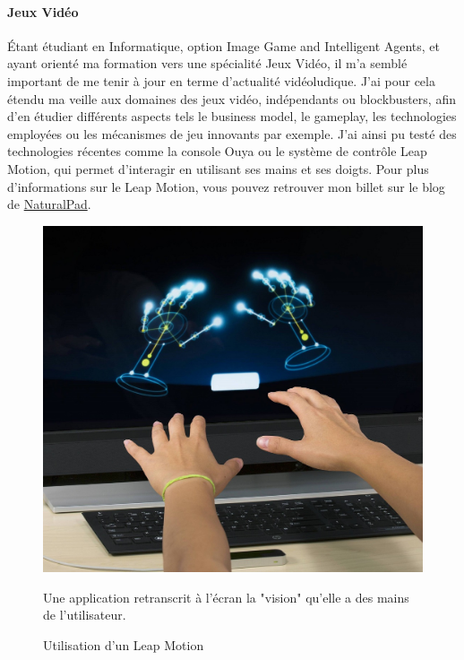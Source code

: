\paragraph{Jeux Vidéo\\ \quad}
Étant étudiant en Informatique, option Image Game and Intelligent Agents, et ayant orienté ma formation vers une spécialité Jeux Vidéo, il m'a semblé important de me tenir à jour en terme d'actualité vidéoludique. J'ai pour cela étendu ma veille aux domaines des jeux vidéo, indépendants ou blockbusters, afin d'en étudier différents aspects tels le business model, le gameplay, les technologies employées ou les mécanismes de jeu innovants par exemple. J'ai ainsi pu testé des technologies récentes comme la console Ouya ou le système de contrôle Leap Motion, qui permet d'interagir en utilisant ses mains et ses doigts. Pour plus d'informations sur le Leap Motion, vous pouvez retrouver mon billet sur le blog de \href{naturalpad.fr/category/naturalblog}{NaturalPad}.
\begin{figure}
	\centering
	\includegraphics{images/leap_motion.jpg}
	\caption{Utilisation d'un Leap Motion}Une application retranscrit à l'écran la "vision" qu'elle a des mains de l'utilisateur.
	\label{leapmotion}
\end{figure}